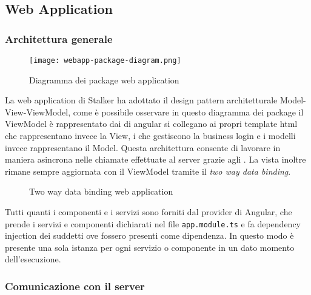 \documentclass[../../manuale-manutentore.tex]{subfiles}
\begin{document}
\subsection{Web Application}%
\label{sub:architettura/web-app}

\subsubsection{Architettura generale}%
\label{subs:architettura_generale}

\begin{figure}[H]
  \centering
  \texttt{[image: webapp-package-diagram.png]}
  \caption{Diagramma dei package web application}%
  \label{fig:web-app-package-diagram}
\end{figure}

La web application di Stalker ha adottato il design pattern architetturale Model-View-ViewModel, come è possibile osservare in questo diagramma dei package il ViewModel è rappresentato dai  di angular si collegano ai propri template html che rappresentano invece la View, i  che gestiscono la business login e i modelli invece rappresentano il Model.
Questa architettura consente di lavorare in maniera asincrona nelle chiamate effettuate al server grazie agli .
La vista inoltre rimane sempre aggiornata con il ViewModel tramite il \textit{two way data binding}.
\begin{figure}[H]
  \centering
  \caption{Two way data binding web application}%
  \label{fig:web-app-databinding}
\end{figure}

Tutti quanti i componenti e i servizi sono forniti dal provider di Angular, che prende i servizi e componenti dichiarati nel file \texttt{app.module.ts} e fa dependency injection dei suddetti ove fossero presenti come dipendenza.
In questo modo è presente una sola istanza per ogni servizio o componente in un dato momento dell'esecuzione.


\subsubsection{Comunicazione con il server}%
\label{subs:comunicazione_server}
\end{document}
